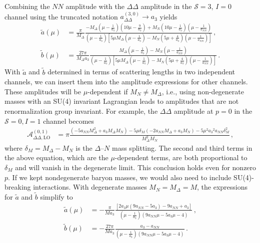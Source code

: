 \documentclass[nofootinbib, preprint, aps, prc, superscriptaddress,11pt]{revtex4-1}
\newcommand{\NN}{\ensuremath{N\!N}\xspace}
\newcommand{\calA}{\ensuremath{\mathcal{A}}}
\newcommand{\1}{\mathbbm{1}}
\newcommand{\at}{\ensuremath{\tilde{a}}\xspace}
\newcommand{\bt}{\ensuremath{\tilde{b}}\xspace}
\newcommand{\aNN}{\ensuremath{a_{\NN}}\xspace}
\newcommand{\aDDthreezero}{\ensuremath{a_3}\xspace}
\newcommand{\D}{\ensuremath{\Delta}\xspace}
\newcommand{\DD}{\ensuremath{\Delta\Delta}\xspace}
\begin{document}
Combining the \NN amplitude with the \DD amplitude in the $\mathscr{S} = 3$, $I=0$ channel using the truncated notation $a_{\DD}^{(3,0)} \to a_3$ yields 
\begin{align}
    \tilde a(\mu) & = \frac{\pi }{M_\Delta }   \frac{- M_\Delta  ( \mu - \frac{1}{\aDDthreezero}) (10 \mu - \frac{9}{\aDDthreezero}) +   M_N (10\mu - \frac{1}{\aDDthreezero}) (\mu-\frac{1}{\aNN})} 
                         {   (\mu - \frac{1}{\aDDthreezero}) \left[ 5  \mu  M_\Delta  (\mu - \frac{1}{\aDDthreezero})-M_N  (5  \mu + \frac{4}{\aDDthreezero}) (\mu - \frac{1}{\aNN})\right]} \, ,\\
    \tilde b(\mu) & = \frac{27 \pi }{M_\Delta \aDDthreezero}  \frac{M_\Delta (\mu -\frac{1}{\aDDthreezero}) - M_N (\mu -\frac{1}{\aNN})}
    {  (\mu -\frac{1}{\aDDthreezero}) 
\left[5  \mu 
   M_\Delta ( \mu - \frac{1}{\aDDthreezero})-M_N (5 \mu + \frac{4}{\aDDthreezero})
   (\mu - \frac{1}{\aNN})\right]} \, .
\end{align}
With \at and \bt determined in terms of scattering lengths in two independent channels, we can insert them into the  amplitude  expressions for other channels.
These amplitudes will be $\mu$-dependent if $M_N \neq M_\Delta$, i.e., using non-degenerate masses with an SU(4) invariant Lagrangian leads to amplitudes that are not renormalization group invariant.
For example, the \DD amplitude at $p=0$ in the $\mathscr{S} = 0, I = 1$ channel becomes
    \begin{align}
        \calA_{\DD,\text{LO}}^{(0,1)} & = \pi \frac{\left(-5 \aNN M_\Delta^2 + \aDDthreezero M_\Delta M_N \right) - 5 \mu \delta_M \left( -2 \aNN M_\Delta + \aDDthreezero M_N \right) - 5 \mu^2 {\aDDthreezero}^2 \aNN \delta_M^2}{M_\Delta^2 M_N} \, ,
    \end{align}
where $\delta_M = M_{\D}-M_N$ is the \D{}--$N$ mass splitting.
The second and third terms in the above equation, which are the $\mu$-dependent terms, are both proportional to $\delta_M$ and will vanish in the degenerate limit.
This conclusion holds even for nonzero $p$.
If we kept nondegenerate baryon masses, we would also need to include SU(4)-breaking interactions.
With degenerate masses $M_N = M_{\D} =M$, the expressions for \at and \bt simplify to 
\begin{align}
\label{eq:atSol}
    \tilde a(\mu) & = - \frac{\pi }{M \aDDthreezero}   \frac{\left[ 2 \aDDthreezero \mu  (9 \aNN - 5 \aDDthreezero)-9 \aNN+\aDDthreezero\right]}{(\mu - \frac{1}{\aDDthreezero}) (9 a_{\NN} \mu -5 \aDDthreezero \mu -4)} \, ,\\
    \label{eq:btSol}
    \tilde b(\mu) & = - \frac{27 \pi }{M \aDDthreezero}   \frac{\aDDthreezero - \aNN}{(\mu - \frac{1}{\aDDthreezero}) (9 a_{\NN} \mu -5 \aDDthreezero \mu -4)} \, .
\end{align}
\end{document}
